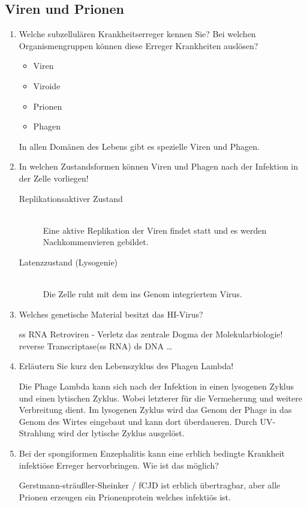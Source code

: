 \subsection{Viren und Prionen}
\begin{enumerate}
	\item Welche subzellulären Krankheitserreger kennen Sie? Bei welchen Organismengruppen können diese Erreger Krankheiten auslösen?
		
		\begin{itemize}
			\item Viren
			\item Viroide
			\item Prionen
			\item Phagen
		\end{itemize}
		
		In allen Domänen des Lebens gibt es spezielle Viren und Phagen.

	\item In welchen Zustandsformen können Viren und Phagen nach der Infektion in der Zelle vorliegen!

		\begin{description}
			\item[Replikationsaktiver Zustand] \hfill \\
				Eine aktive Replikation der Viren findet statt und es werden Nachkommenvieren gebildet.
			\item[Latenzzustand (Lysogenie)] \hfill \\
				Die Zelle ruht mit dem ins Genom integriertem Virus.
		\end{description}

	\item Welches genetische Material besitzt das HI-Virus? 
		
		ss RNA Retroviren - Verletz das zentrale Dogma der Molekularbiologie!\\
		\vspace{1cm}
		reverse Transcriptase(ss RNA) \textrightarrow ds DNA \ldots

	\item Erläutern Sie kurz den Lebenszyklus des Phagen Lambda!

		Die Phage Lambda kann sich nach der Infektion in einen lysogenen Zyklus
		und einen lytischen Zyklus.
		Wobei letzterer für die Vermeherung und weitere Verbreitung dient.
		Im lysogenen Zyklus wird das Genom der Phage in das Genom des Wirtes eingebaut und kann dort überdaueren.
		Durch UV-Strahlung wird der lytische Zyklus ausgelöst.

	\item Bei der spongiformen Enzephalitis kann eine erblich bedingte Krankheit infektiöse Erreger hervorbringen. Wie ist das möglich?
		
		Gerstmann-sträußler-Sheinker / fCJD ist erblich übertragbar,
		aber alle Prionen erzeugen ein Prionenprotein welches infektiös ist.

\end{enumerate}
